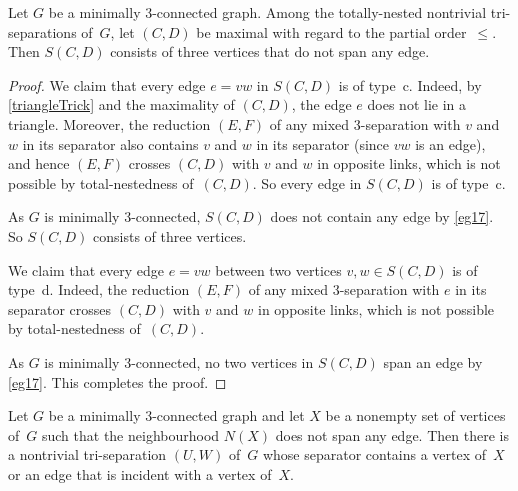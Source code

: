 \documentclass{aic}
\theoremstyle{plain}
\theoremstyle{definition}
\theoremstyle{plain}
\theoremstyle{plain}
\renewcommand{\le}{\leqslant}
\begin{document}
\begin{lem}\label{totally-nice}
    Let $G$ be a minimally 3-connected graph. 
    Among the totally-nested nontrivial tri-separations of~$G$, let $(C,D)$ be maximal with regard to the partial order~$\le$.
    Then $S(C,D)$ consists of three vertices that do not span any edge.
\end{lem}

\begin{proof}
We claim that every edge $e=vw$ in $S(C,D)$ is of type~c. 
Indeed, by \autoref{triangleTrick} and the maximality of $(C,D)$, the edge $e$ does not lie in a triangle.
Moreover, the reduction $(E,F)$ of any mixed 3-separation with $v$ and $w$ in its separator also contains $v$ and $w$ in its separator (since $vw$ is an edge), and hence $(E,F)$ crosses $(C,D)$ with $v$ and $w$ in opposite links, which is not possible by total-nestedness of~$(C,D)$.
So every edge in $S(C,D)$ is of type~c.

As $G$ is minimally 3-connected, $S(C,D)$ does not contain any edge by \autoref{eg17}.
So $S(C,D)$ consists of three vertices.

We claim that every edge $e=vw$ between two vertices $v,w\in S(C,D)$ is of type~d.
Indeed, the reduction $(E,F)$ of any mixed 3-separation with $e$ in its separator crosses $(C,D)$ with $v$ and $w$ in opposite links, which is not possible by total-nestedness of~$(C,D)$.

As $G$ is minimally 3-connected, no two vertices in $S(C,D)$ span an edge by \autoref{eg17}. 
This completes the proof. 
\end{proof}

\begin{lem}\label{technical1}
    Let $G$ be a minimally 3-connected graph and let $X$ be a nonempty set of vertices of~$G$ such that the neighbourhood $N(X)$ does not span any edge. 
    Then there is a nontrivial tri-separation $(U,W)$ of~$G$ whose separator contains a vertex of~$X$ or an edge that is incident with a vertex of~$X$. 
\end{lem}
\end{document}
